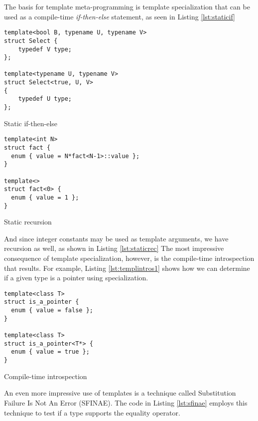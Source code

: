 The basis for template meta-programming is template specialization that can be used as a compile-time \emph{if-then-else} statement, as seen in Listing \ref{lst:staticif}

\begin{listing}[H]
\begin{verbatim}
template<bool B, typename U, typename V>
struct Select {
	typedef V type;
};

template<typename U, typename V>
struct Select<true, U, V>
{
	typedef U type;
};
\end{verbatim}
\caption{Static if-then-else}
\label{lst:staticif}
\end{listing}
\begin{listing}[H]
\begin{verbatim}
template<int N>
struct fact {
  enum { value = N*fact<N-1>::value };
}

template<>
struct fact<0> {
  enum { value = 1 };
}
\end{verbatim}
\caption{Static recursion}
\label{lst:staticrec}
\end{listing}

And since integer constants may be used as template arguments, we have recursion as well, as shown in Listing \ref{lst:staticrec}
The most impressive consequence of template specialization, however, is the compile-time introspection that results. For example,
Listing \ref{lst:templintros1} shows how we can determine if a given type is a pointer using specialization.

\begin{listing}[H]
\begin{verbatim}
template<class T>
struct is_a_pointer {
  enum { value = false };
}

template<class T>
struct is_a_pointer<T*> {
  enum { value = true };
}
\end{verbatim}
\caption{Compile-time introspection}
\label{lst:templintros1}
\end{listing}

An even more impressive use of templates is a technique called Substitution Failure Is Not An Error (SFINAE).
The code in Listing \ref{lst:sfinae} employs this technique to test if a type supports the equality operator.


